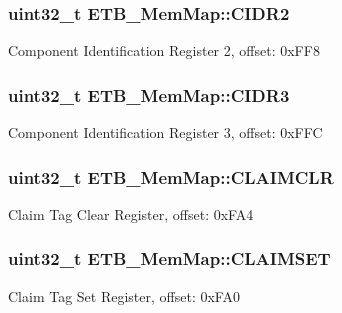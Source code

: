 \subsubsection[{C\+I\+D\+R2}]{\setlength{\rightskip}{0pt plus 5cm}uint32\+\_\+t E\+T\+B\+\_\+\+Mem\+Map\+::\+C\+I\+D\+R2}\label{struct_e_t_b___mem_map_a21c4d78f89b6495cdcd781c34f483f42}
Component Identification Register 2, offset\+: 0x\+F\+F8 \hypertarget{struct_e_t_b___mem_map_a54c5d31e149764075338797e0705a826}{}
\subsubsection[{C\+I\+D\+R3}]{\setlength{\rightskip}{0pt plus 5cm}uint32\+\_\+t E\+T\+B\+\_\+\+Mem\+Map\+::\+C\+I\+D\+R3}\label{struct_e_t_b___mem_map_a54c5d31e149764075338797e0705a826}
Component Identification Register 3, offset\+: 0x\+F\+F\+C \hypertarget{struct_e_t_b___mem_map_a0cb75f3c7b540c1f7745a67001822749}{}
\subsubsection[{C\+L\+A\+I\+M\+C\+L\+R}]{\setlength{\rightskip}{0pt plus 5cm}uint32\+\_\+t E\+T\+B\+\_\+\+Mem\+Map\+::\+C\+L\+A\+I\+M\+C\+L\+R}\label{struct_e_t_b___mem_map_a0cb75f3c7b540c1f7745a67001822749}
Claim Tag Clear Register, offset\+: 0x\+F\+A4 \hypertarget{struct_e_t_b___mem_map_a86f547f97e9ad1895c1fb03ae9c25931}{}
\subsubsection[{C\+L\+A\+I\+M\+S\+E\+T}]{\setlength{\rightskip}{0pt plus 5cm}uint32\+\_\+t E\+T\+B\+\_\+\+Mem\+Map\+::\+C\+L\+A\+I\+M\+S\+E\+T}\label{struct_e_t_b___mem_map_a86f547f97e9ad1895c1fb03ae9c25931}
Claim Tag Set Register, offset\+: 0x\+F\+A0 \hypertarget{struct_e_t_b___mem_map_a12988dd241cd1b4936f513afcd6fa803}{}
